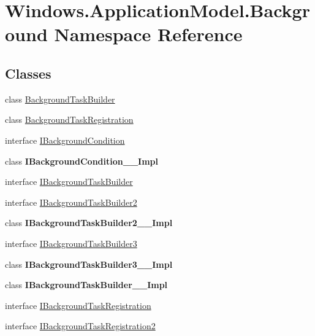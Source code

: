 \hypertarget{namespace_windows_1_1_application_model_1_1_background}{}\section{Windows.\+Application\+Model.\+Background Namespace Reference}
\label{namespace_windows_1_1_application_model_1_1_background}
\subsection*{Classes}
\begin{DoxyCompactItemize}
\item 
class \hyperlink{class_windows_1_1_application_model_1_1_background_1_1_background_task_builder}{Background\+Task\+Builder}
\item 
class \hyperlink{class_windows_1_1_application_model_1_1_background_1_1_background_task_registration}{Background\+Task\+Registration}
\item 
interface \hyperlink{interface_windows_1_1_application_model_1_1_background_1_1_i_background_condition}{I\+Background\+Condition}
\item 
class {\bfseries I\+Background\+Condition\+\_\+\+\_\+\+Impl}
\item 
interface \hyperlink{interface_windows_1_1_application_model_1_1_background_1_1_i_background_task_builder}{I\+Background\+Task\+Builder}
\item 
interface \hyperlink{interface_windows_1_1_application_model_1_1_background_1_1_i_background_task_builder2}{I\+Background\+Task\+Builder2}
\item 
class {\bfseries I\+Background\+Task\+Builder2\+\_\+\+\_\+\+Impl}
\item 
interface \hyperlink{interface_windows_1_1_application_model_1_1_background_1_1_i_background_task_builder3}{I\+Background\+Task\+Builder3}
\item 
class {\bfseries I\+Background\+Task\+Builder3\+\_\+\+\_\+\+Impl}
\item 
class {\bfseries I\+Background\+Task\+Builder\+\_\+\+\_\+\+Impl}
\item 
interface \hyperlink{interface_windows_1_1_application_model_1_1_background_1_1_i_background_task_registration}{I\+Background\+Task\+Registration}
\item 
interface \hyperlink{interface_windows_1_1_application_model_1_1_background_1_1_i_background_task_registration2}{I\+Background\+Task\+Registration2}

\end{DoxyCompactItemize}
